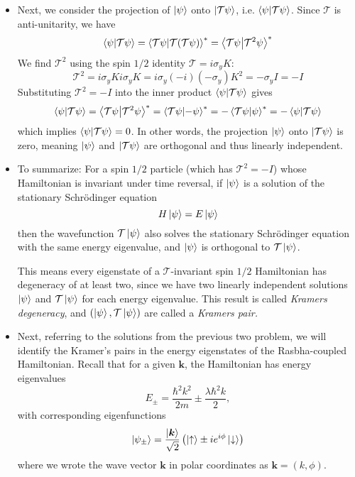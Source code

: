 \documentclass[11pt, a4paper]{article}
\newcommand{\Schro}{Schr\"{o}dinger\xspace}
\newcommand{\Ham}{Hamiltonian\xspace}
\renewcommand{\vec}[1]{\bm{#1}} %
\newcommand{\ua}{\uparrow}  %
\newcommand{\da}{\downarrow}  %
\renewcommand{\k}{\vec{k}}  %
\newcommand{\T}{\mathcal{T}}  %
\begin{document}
\begin{itemize}
	\item Next, we consider the projection of $ \ket{\psi} $ onto $ \ket{\T \psi} $, i.e. $ \braket{\psi}{\T\psi} $. Since $ \T $ is anti-unitarity, we have
	\begin{equation*}
		\braket{\psi}{\T\psi} = \braket{\T\psi}{\T(\T\psi)}^{*} = \braket{\T\psi}{\T^{2}\psi}^{*}
	\end{equation*}
	We find $ \T^{2} $ using the spin $ 1/2 $ identity $ \T = i \sigma_{y}K $:
	\begin{equation*}
		\T^{2} = i \sigma_{y}K i\sigma_{y}K = i\sigma_{y}(-i)(-\sigma_{y})K^{2} = -\sigma_{y} I = - I
	\end{equation*}
	Substituting $ \T^{2} = - I $ into the inner product $ \braket{\psi}{\T\psi} $ gives
	\begin{equation*}
		\braket{\psi}{\T\psi} = \braket{\T\psi}{\T^{2}\psi}^{*} = \braket{\T\psi}{-\psi}^{*} = -\braket{\T\psi}{\psi}^{*} = - \braket{\psi}{\T\psi}
	\end{equation*}
	which implies $ \braket{\psi}{\T\psi} = 0 $. In other words, the projection  $ \ket{\psi} $ onto $ \ket{\T \psi} $ is zero, meaning $ \ket{\psi} $ and $ \ket{\T \psi} $ are orthogonal and thus linearly independent.
	
	
	\item To summarize: For a spin $ 1/2 $ particle (which has $ \T^{2} = -I $) whose Hamiltonian is invariant under time reversal, if $ \ket{\psi} $ is a solution of the stationary \Schro equation
	\begin{equation*}
		H \ket{\psi} = E\ket{\psi}
	\end{equation*}
	then the wavefunction $ \T\ket{\psi} $ also solves the stationary \Schro equation with the same energy eigenvalue, and $ \ket{\psi} $ is orthogonal to $ \T \ket{\psi} $. 
	
	This means every eigenstate of a $ \T $-invariant spin $ 1/2 $ Hamiltonian has degeneracy of at least two, since we have two linearly independent solutions $ \ket{\psi} $ and $ \T \ket{\psi} $ for each energy eigenvalue. This result is called \textit{Kramers degeneracy}, and $ (\ket{\psi}, \T\ket{\psi}) $ are called a \textit{Kramers pair. }

	\item Next, referring to the solutions from the previous two problem, we will identify the Kramer's pairs in the energy eigenstates of the Rasbha-coupled Hamiltonian. Recall that for a given $ \k $, the \Ham has energy eigenvalues
	\begin{equation*}
		E_{\pm} = \frac{\hbar^{2}k^{2}}{2m} \pm \frac{\lambda\hbar^{2}k}{2},
	\end{equation*}
	with corresponding eigenfunctions
	\begin{equation*}
		\ket{\psi_{\pm}} = \frac{\ket{\k}}{\sqrt{2}}\left(\ket{\ua} \pm ie^{i\phi}\ket{\da}\right)
	\end{equation*}
	where we wrote the wave vector $ \k $ in polar coordinates as $ \k = (k, \phi) $. 
	

\end{itemize}
\end{document}
